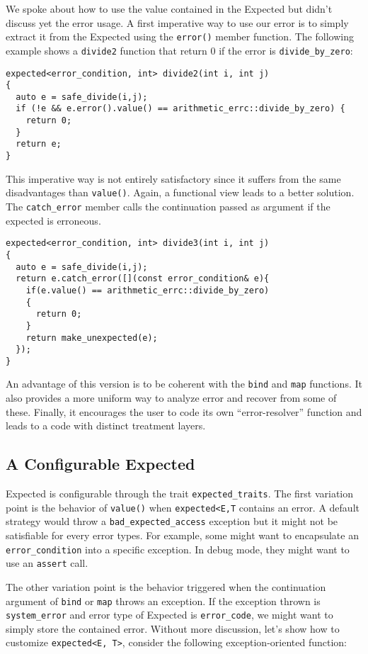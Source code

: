 \documentclass[a4paper,10pt]{article}
\newcommand{\cpp}[1]{\lstinline{#1}}
\begin{document}
We spoke about how to use the value contained in the Expected but didn't discuss yet the error usage. A first imperative way to use our error is to simply extract it from the Expected using the \cpp{error()} member function. The following example shows a \cpp{divide2} function that return 0 if the error is \cpp{divide_by_zero}:

\begin{lstlisting}
expected<error_condition, int> divide2(int i, int j)
{
  auto e = safe_divide(i,j);
  if (!e && e.error().value() == arithmetic_errc::divide_by_zero) {
    return 0;
  }
  return e;
}
\end{lstlisting}

This imperative way is not entirely satisfactory since it suffers from the same disadvantages than \cpp{value()}. Again, a functional view leads to a better solution. The \cpp{catch_error} member calls the continuation passed as argument if the expected is erroneous.

\begin{lstlisting}
expected<error_condition, int> divide3(int i, int j)
{
  auto e = safe_divide(i,j);
  return e.catch_error([](const error_condition& e){
    if(e.value() == arithmetic_errc::divide_by_zero)
    {
      return 0;
    }
    return make_unexpected(e);
  });
}
\end{lstlisting}

An advantage of this version is to be coherent with the \cpp{bind} and \cpp{map} functions. It also provides a more uniform way to analyze error and recover from some of these. Finally, it encourages the user to code its own ``error-resolver'' function and leads to a code with distinct treatment layers.

\subsection{A Configurable Expected}

Expected is configurable through the trait \cpp{expected_traits}. The first variation point is the behavior of \cpp{value()} when \cpp{expected<E,T} contains an error. A default strategy would throw a \cpp{bad_expected_access} exception but it might not be satisfiable for every error types. For example, some might want to encapsulate an \cpp{error_condition} into a specific exception. In debug mode, they might want to use an \cpp{assert} call.

The other variation point is the behavior triggered when the continuation argument of \cpp{bind} or \cpp{map} throws an exception. If the exception thrown is \cpp{system_error} and error type of Expected is \cpp{error_code}, we might want to simply store the contained error. Without more discussion, let's show how to customize \cpp{expected<E, T>}, consider the following exception-oriented function:
\end{document}
